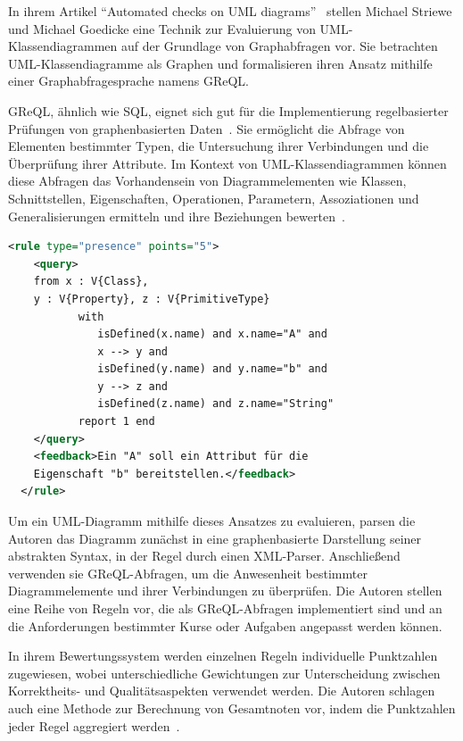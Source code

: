 In ihrem Artikel ``Automated checks on UML diagrams''~\cite{striewe2011automated} stellen Michael Striewe und Michael
Goedicke eine Technik zur Evaluierung von UML-Klassendiagrammen auf der Grundlage von Graphabfragen vor. Sie betrachten
UML-Klassendiagramme als Graphen und formalisieren ihren Ansatz mithilfe einer Graphabfragesprache namens GReQL.

\ac{GReQL}, ähnlich wie SQL, eignet sich gut für die Implementierung regelbasierter Prüfungen von graphenbasierten
Daten~\cite{striewe2014automated}. Sie ermöglicht die Abfrage von Elementen bestimmter Typen, die Untersuchung ihrer
Verbindungen und die Überprüfung ihrer Attribute. Im Kontext von UML-Klassendiagrammen können diese Abfragen das
Vorhandensein von Diagrammelementen wie Klassen, Schnittstellen, Eigenschaften, Operationen, Parametern, Assoziationen
und Generalisierungen ermitteln und ihre Beziehungen bewerten~\cite{striewe2011automated}.

\begin{lstlisting}[caption={[Codebeispiel] Codebeispiel in GReQL}, label={lst:greql}, float=!ht, language=xml]
  <rule type="presence" points="5">
    <query>
    from x : V{Class},
    y : V{Property}, z : V{PrimitiveType}
           with
              isDefined(x.name) and x.name="A" and
              x --> y and
              isDefined(y.name) and y.name="b" and
              y --> z and
              isDefined(z.name) and z.name="String"
           report 1 end
    </query>
    <feedback>Ein "A" soll ein Attribut für die
    Eigenschaft "b" bereitstellen.</feedback>
  </rule>
\end{lstlisting}

Um ein UML-Diagramm mithilfe dieses Ansatzes zu evaluieren, parsen die Autoren das Diagramm zunächst in eine
graphenbasierte Darstellung seiner abstrakten Syntax, in der Regel durch einen XML-Parser. Anschließend verwenden sie
\ac{GReQL}-Abfragen, um die Anwesenheit bestimmter Diagrammelemente und ihrer Verbindungen zu überprüfen. Die Autoren
stellen eine Reihe von Regeln vor, die als \ac{GReQL}-Abfragen implementiert sind und an die Anforderungen bestimmter
Kurse oder Aufgaben angepasst werden können.

In ihrem Bewertungssystem werden einzelnen Regeln individuelle Punktzahlen zugewiesen, wobei unterschiedliche
Gewichtungen zur Unterscheidung zwischen Korrektheits- und Qualitätsaspekten verwendet werden. Die Autoren schlagen auch
eine Methode zur Berechnung von Gesamtnoten vor, indem die Punktzahlen jeder Regel aggregiert werden~\cite{striewe2011automated}.

